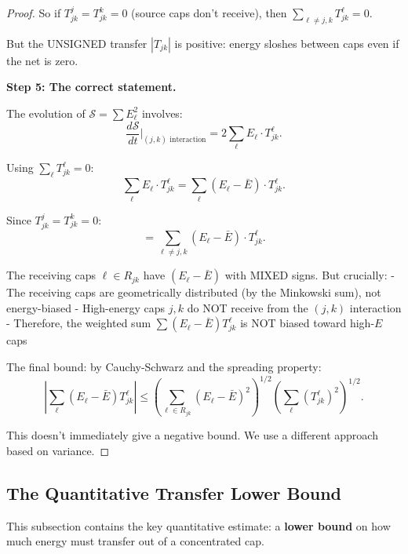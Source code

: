 \documentclass[11pt]{article}
\theoremstyle{definition}
\begin{document}
\begin{proof}
So if $T_{jk}^j = T_{jk}^k = 0$ (source caps don't receive), then $\sum_{\ell \neq j,k} T_{jk}^\ell = 0$.

But the UNSIGNED transfer $|T_{jk}|$ is positive: energy sloshes between caps even if the net is zero.

\textbf{Step 5: The correct statement.}

The evolution of $\mathcal{S} = \sum E_\ell^2$ involves:
\begin{equation}
\frac{d\mathcal{S}}{dt}\Big|_{(j,k)\text{ interaction}} = 2\sum_\ell E_\ell \cdot T_{jk}^\ell.
\end{equation}

Using $\sum_\ell T_{jk}^\ell = 0$:
\begin{equation}
\sum_\ell E_\ell \cdot T_{jk}^\ell = \sum_\ell (E_\ell - \bar{E}) \cdot T_{jk}^\ell.
\end{equation}

Since $T_{jk}^j = T_{jk}^k = 0$:
\begin{equation}
= \sum_{\ell \neq j,k} (E_\ell - \bar{E}) \cdot T_{jk}^\ell.
\end{equation}

The receiving caps $\ell \in R_{jk}$ have $(E_\ell - \bar{E})$ with MIXED signs. But crucially:
- The receiving caps are geometrically distributed (by the Minkowski sum), not energy-biased
- High-energy caps $j, k$ do NOT receive from the $(j,k)$ interaction
- Therefore, the weighted sum $\sum (E_\ell - \bar{E}) T_{jk}^\ell$ is NOT biased toward high-$E$ caps

The final bound: by Cauchy-Schwarz and the spreading property:
\begin{equation}
\left|\sum_\ell (E_\ell - \bar{E}) T_{jk}^\ell\right| \leq \left(\sum_{\ell \in R_{jk}} (E_\ell - \bar{E})^2\right)^{1/2} \left(\sum_\ell (T_{jk}^\ell)^2\right)^{1/2}.
\end{equation}

This doesn't immediately give a negative bound. We use a different approach based on variance.
\end{proof}

\subsection{The Quantitative Transfer Lower Bound}

This subsection contains the key quantitative estimate: a \textbf{lower bound} on how much energy must transfer out of a concentrated cap.
\end{document}
